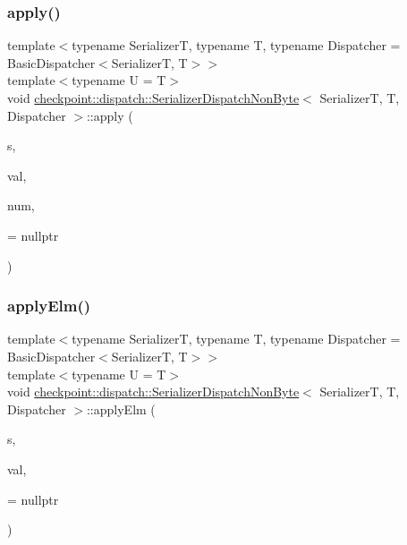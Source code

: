 \subsubsection{\texorpdfstring{apply()}{apply()}\hspace{0.1cm}{\footnotesize\ttfamily [2/2]}}
{\footnotesize\ttfamily template$<$typename SerializerT, typename T, typename Dispatcher = Basic\+Dispatcher$<$\+Serializer\+T, T$>$$>$ \\
template$<$typename U  = T$>$ \\
void \hyperlink{structcheckpoint_1_1dispatch_1_1_serializer_dispatch_non_byte}{checkpoint\+::dispatch\+::\+Serializer\+Dispatch\+Non\+Byte}$<$ SerializerT, T, Dispatcher $>$\+::apply (\begin{DoxyParamCaption}\item[{SerializerT \&}]{s,  }\item[{T $\ast$}]{val,  }\item[{\hyperlink{namespacecheckpoint_a083f6674da3f94c2901b18c6d238217c}{Serial\+Size\+Type}}]{num,  }\item[{\hyperlink{structcheckpoint_1_1dispatch_1_1_serializer_dispatch_non_byte_aa9c0d5e9e139a9d922b1ce4adf339465}{has\+Not\+Virtual\+Serialize}$<$ U $>$ $\ast$}]{ = {\ttfamily nullptr} }\end{DoxyParamCaption})\hspace{0.3cm}{\ttfamily [inline]}}

\mbox{\label{structcheckpoint_1_1dispatch_1_1_serializer_dispatch_non_byte_a3bbb12db16d00e1c76e51b52452187aa}} 
\subsubsection{\texorpdfstring{apply\+Elm()}{applyElm()}\hspace{0.1cm}{\footnotesize\ttfamily [1/3]}}
{\footnotesize\ttfamily template$<$typename SerializerT, typename T, typename Dispatcher = Basic\+Dispatcher$<$\+Serializer\+T, T$>$$>$ \\
template$<$typename U  = T$>$ \\
void \hyperlink{structcheckpoint_1_1dispatch_1_1_serializer_dispatch_non_byte}{checkpoint\+::dispatch\+::\+Serializer\+Dispatch\+Non\+Byte}$<$ SerializerT, T, Dispatcher $>$\+::apply\+Elm (\begin{DoxyParamCaption}\item[{SerializerT \&}]{s,  }\item[{T $\ast$}]{val,  }\item[{\hyperlink{structcheckpoint_1_1dispatch_1_1_serializer_dispatch_non_byte_a36fe4f2245004d2daa486a9e47b98b71}{has\+Split\+Serialize}$<$ U $>$ $\ast$}]{ = {\ttfamily nullptr} }\end{DoxyParamCaption})\hspace{0.3cm}{\ttfamily [inline]}}

